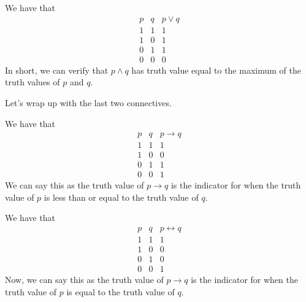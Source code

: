 \documentclass[../notes.tex]{subfiles}
\begin{document}
\begin{example}
	We have that
	\[\begin{array}{c|c||c}
		p & q & p\lor q \\\hline
		1 & 1 & 1 \\
		1 & 0 & 1 \\
		0 & 1 & 1 \\
		0 & 0 & 0
	\end{array}\]
	In short, we can verify that $p\land q$ has truth value equal to the maximum of the truth values of $p$ and $q$.
\end{example}
Let's wrap up with the last two connectives.
\begin{example}
	We have that
	\[\begin{array}{c|c||c}
		p & q & p\to q \\\hline
		1 & 1 & 1 \\
		1 & 0 & 0 \\
		0 & 1 & 1 \\
		0 & 0 & 1
	\end{array}\]
	We can say this as the truth value of $p\to q$ is the indicator for when the truth value of $p$ is less than or equal to the truth value of $q$.
\end{example}
\begin{example}
	We have that
	\[\begin{array}{c|c||c}
		p & q & p\leftrightarrow q \\\hline
		1 & 1 & 1 \\
		1 & 0 & 0 \\
		0 & 1 & 0 \\
		0 & 0 & 1
	\end{array}\]
	Now, we can say this as the truth value of $p\to q$ is the indicator for when the truth value of $p$ is equal to the truth value of $q$.
\end{example}
\end{document}
